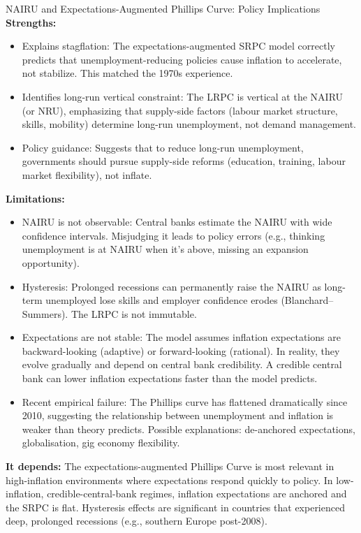 \documentclass[11pt, a4paper, twoside]{book}
\begin{document}
\begin{evaluation}{NAIRU and Expectations-Augmented Phillips Curve: Policy Implications}
\textbf{Strengths:}
\begin{itemize}
  \item Explains stagflation: The expectations-augmented SRPC model correctly predicts that unemployment-reducing policies cause inflation to accelerate, not stabilize. This matched the 1970s experience.
  \item Identifies long-run vertical constraint: The LRPC is vertical at the NAIRU (or NRU), emphasizing that supply-side factors (labour market structure, skills, mobility) determine long-run unemployment, not demand management.
  \item Policy guidance: Suggests that to reduce long-run unemployment, governments should pursue supply-side reforms (education, training, labour market flexibility), not inflate.
\end{itemize}

\textbf{Limitations:}
\begin{itemize}
  \item NAIRU is not observable: Central banks estimate the NAIRU with wide confidence intervals. Misjudging it leads to policy errors (e.g., thinking unemployment is at NAIRU when it's above, missing an expansion opportunity).
  \item Hysteresis: Prolonged recessions can permanently raise the NAIRU as long-term unemployed lose skills and employer confidence erodes (Blanchard--Summers). The LRPC is not immutable.
  \item Expectations are not stable: The model assumes inflation expectations are backward-looking (adaptive) or forward-looking (rational). In reality, they evolve gradually and depend on central bank credibility. A credible central bank can lower inflation expectations faster than the model predicts.
  \item Recent empirical failure: The Phillips curve has flattened dramatically since 2010, suggesting the relationship between unemployment and inflation is weaker than theory predicts. Possible explanations: de-anchored expectations, globalisation, gig economy flexibility.
\end{itemize}

\textbf{It depends:}
The expectations-augmented Phillips Curve is most relevant in high-inflation environments where expectations respond quickly to policy. In low-inflation, credible-central-bank regimes, inflation expectations are anchored and the SRPC is flat. Hysteresis effects are significant in countries that experienced deep, prolonged recessions (e.g., southern Europe post-2008).
\end{evaluation}
\end{document}
